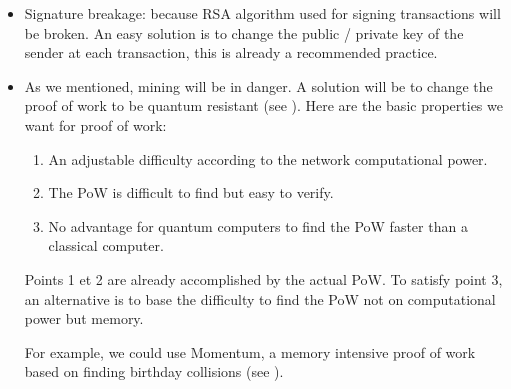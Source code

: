 \begin{itemize}
  \item Signature breakage: because RSA algorithm used for signing transactions will be broken. An easy solution is to change the public / private key of the sender at each transaction, this is already a recommended practice.
  \item As we mentioned, mining will be in danger. A solution will be to change the proof of work to be quantum resistant (see \cite{quantum_attacks}). Here are the basic properties we want for proof of work: \newline

  \begin{enumerate}
    \item An adjustable difficulty according to the network computational power.
    \item The PoW is difficult to find but easy to verify.
    \item No advantage for quantum computers to find the PoW faster than a classical computer.
  \end{enumerate}
  \medskip

  Points 1 et 2 are already accomplished by the actual PoW. To satisfy point 3, an alternative is to base the difficulty to find the PoW not on computational power but memory. \newline

  For example, we could use Momentum, a memory intensive proof of work based on finding birthday collisions (see \cite{momentum}).
\end{itemize}
